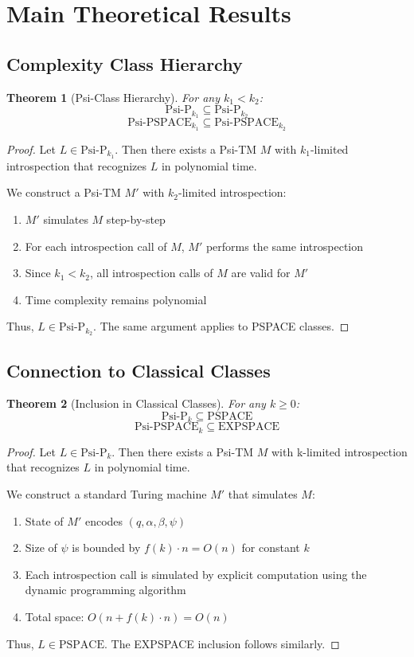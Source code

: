 \documentclass[11pt]{article}
\newtheorem{theorem}{Theorem}
\begin{document}
\section{Main Theoretical Results}

\subsection{Complexity Class Hierarchy}

\begin{theorem}[Psi-Class Hierarchy]
For any $k_1 < k_2$:
$$\text{Psi-P}_{k_1} \subseteq \text{Psi-P}_{k_2}$$
$$\text{Psi-PSPACE}_{k_1} \subseteq \text{Psi-PSPACE}_{k_2}$$
\end{theorem}

\begin{proof}
Let $L \in \text{Psi-P}_{k_1}$. Then there exists a Psi-TM $M$ with $k_1$-limited introspection that recognizes $L$ in polynomial time.

We construct a Psi-TM $M'$ with $k_2$-limited introspection:
\begin{enumerate}
\item $M'$ simulates $M$ step-by-step
\item For each introspection call of $M$, $M'$ performs the same introspection
\item Since $k_1 < k_2$, all introspection calls of $M$ are valid for $M'$
\item Time complexity remains polynomial
\end{enumerate}

Thus, $L \in \text{Psi-P}_{k_2}$. The same argument applies to PSPACE classes.
\end{proof}

\subsection{Connection to Classical Classes}

\begin{theorem}[Inclusion in Classical Classes]
For any $k \geq 0$:
$$\text{Psi-P}_k \subseteq \text{PSPACE}$$
$$\text{Psi-PSPACE}_k \subseteq \text{EXPSPACE}$$
\end{theorem}

\begin{proof}
Let $L \in \text{Psi-P}_k$. Then there exists a Psi-TM $M$ with k-limited introspection that recognizes $L$ in polynomial time.

We construct a standard Turing machine $M'$ that simulates $M$:
\begin{enumerate}
\item State of $M'$ encodes $(q, \alpha, \beta, \psi)$
\item Size of $\psi$ is bounded by $f(k) \cdot n = O(n)$ for constant $k$
\item Each introspection call is simulated by explicit computation using the dynamic programming algorithm
\item Total space: $O(n + f(k) \cdot n) = O(n)$
\end{enumerate}

Thus, $L \in \text{PSPACE}$. The EXPSPACE inclusion follows similarly.
\end{proof}
\end{document}
